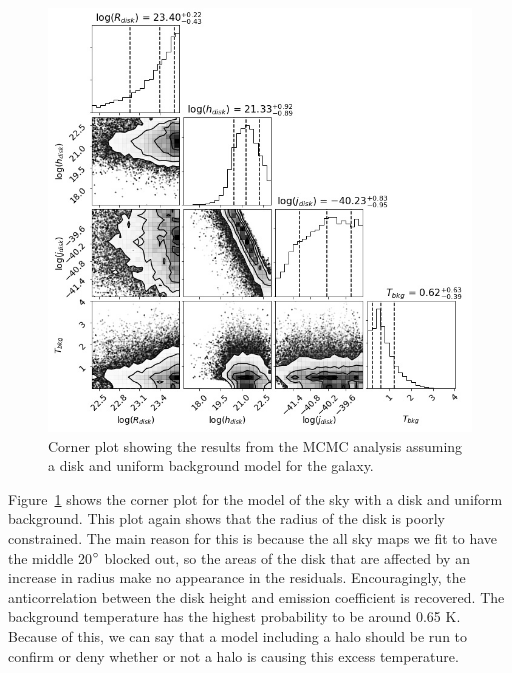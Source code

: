 \documentclass[letterpaper, 10pt]{article}
\begin{document}
\begin{figure}[H]
\begin{center}
\includegraphics[width=\textwidth]{corner_disk+bkg.jpg}
\caption{Corner plot showing the results from the MCMC analysis assuming a disk and uniform background model for the galaxy.}
\label{corner_disk+bkg}
\end{center}
\end{figure}

Figure~\ref{corner_disk+bkg} shows the corner plot for the model of the sky with a disk and uniform background. This plot again shows that the radius of the disk is poorly constrained. The main reason for this is because the all sky maps we fit to have the middle 20$\degree$ blocked out, so the areas of the disk that are affected by an increase in radius make no appearance in the residuals. Encouragingly, the anticorrelation between the disk height and emission coefficient is recovered. The background temperature has the highest probability to be around 0.65 K. Because of this, we can say that a model including a halo should be run to confirm or deny whether or not a halo is causing this excess temperature.

\newpage
\end{document}

